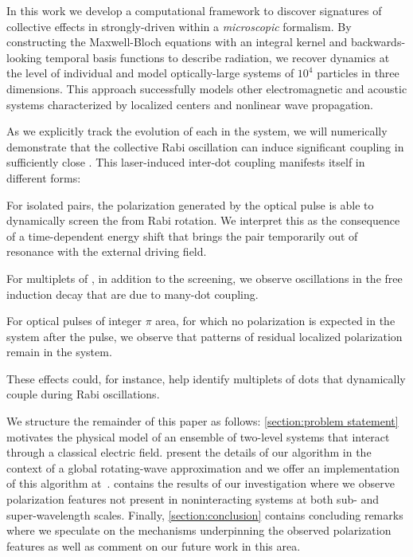 In this work we develop a computational framework to discover signatures of collective effects in strongly-driven \qds{} within a {\it microscopic} formalism.
By constructing the Maxwell-Bloch equations with an integral kernel and backwards-looking temporal basis functions to describe radiation, we recover dynamics at the level of individual \qds{} and model optically-large systems of $10^4$ particles in three dimensions.
This approach successfully models other electromagnetic \cite{otherpapersfromshanker} and acoustic \cite{Glosser2016} systems characterized by localized centers and nonlinear wave propagation.

As we explicitly track the evolution of each \qd{} in the system, we will numerically demonstrate that the collective Rabi oscillation can induce significant coupling in sufficiently close \qds{}.
This laser-induced inter-dot coupling manifests itself in different forms:
\begin{inparaenum}[(i)]
  \item For isolated \qd{} pairs, the polarization generated by the optical pulse is able to dynamically screen the \qds{} from Rabi rotation.
    We interpret this as the consequence of a time-dependent energy shift that brings the pair temporarily out of resonance with the external driving field.
  \item For multiplets of \qds{}, in addition to the screening, we observe oscillations in the free induction decay that are due to many-dot coupling.
  \item For optical pulses of integer $\pi$ area, for which no polarization is expected in the system after the pulse, we observe that patterns of residual localized polarization remain in the system.
\end{inparaenum}
These effects could, for instance, help identify multiplets of dots that dynamically couple during Rabi oscillations.

We structure the remainder of this paper as follows: \cref{section:problem statement} motivates the physical model of an ensemble of two-level systems that interact through a classical electric field.
 present the details of our algorithm in the context of a global rotating-wave approximation and we offer an implementation of this algorithm at~\cite{githubpage}.
 contains the results of our investigation where we observe polarization features not present in noninteracting systems at both sub- and super-wavelength scales.
Finally, \cref{section:conclusion} contains concluding remarks where we speculate on the mechanisms underpinning the observed polarization features as well as comment on our future work in this area.
